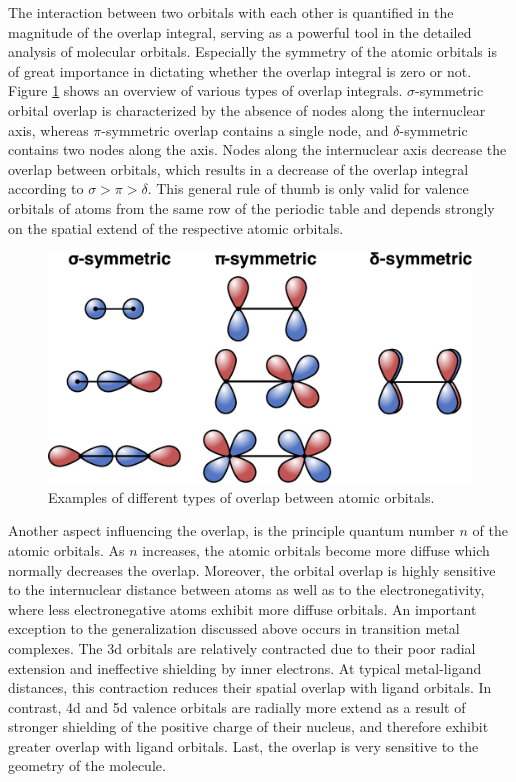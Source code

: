 \noindent
The interaction between two orbitals with each other is quantified in the magnitude of the overlap integral, serving as a powerful tool in the detailed analysis of molecular orbitals. Especially the symmetry of the atomic orbitals is of great importance in dictating whether the overlap integral is zero or not. Figure \ref{fig:symmetry_MOs} shows an overview of various types of overlap integrals. $\sigma$-symmetric orbital overlap is characterized by the absence of nodes along the internuclear axis, whereas $\pi$-symmetric overlap contains a single node, and $\delta$-symmetric contains two nodes along the axis. Nodes along the internuclear axis decrease the overlap between orbitals, which results in a decrease of the overlap integral according to $\sigma > \pi > \delta$. This general rule of thumb is only valid for valence orbitals of atoms from the same row of the periodic table \cite{albright2013orbital} and depends strongly on the spatial extend of the respective atomic orbitals.
\begin{figure}[H]
    \centering
    \includegraphics[width=0.8\linewidth]{Figures/Symmetry_orbitals.pdf}
    \caption{Examples of different types of overlap between atomic orbitals. }
    \label{fig:symmetry_MOs}
\end{figure}
\noindent
Another aspect influencing the overlap, is the principle quantum number $n$ of the atomic orbitals. As $n$ increases, the atomic orbitals become more diffuse which normally decreases the overlap. Moreover, the orbital overlap is highly sensitive to the internuclear distance between atoms as well as to the electronegativity, where less electronegative atoms exhibit more diffuse orbitals. An important exception to the generalization discussed above occurs in transition metal complexes. The 3d orbitals are relatively contracted due to their poor radial extension and ineffective shielding by inner electrons. At typical metal-ligand distances, this contraction reduces their spatial overlap with ligand orbitals. In contrast, 4d and 5d valence orbitals are radially more extend as a result of stronger shielding of the positive charge of their nucleus, and therefore exhibit greater overlap with ligand orbitals. Last, the overlap is very sensitive to the geometry of the molecule.
